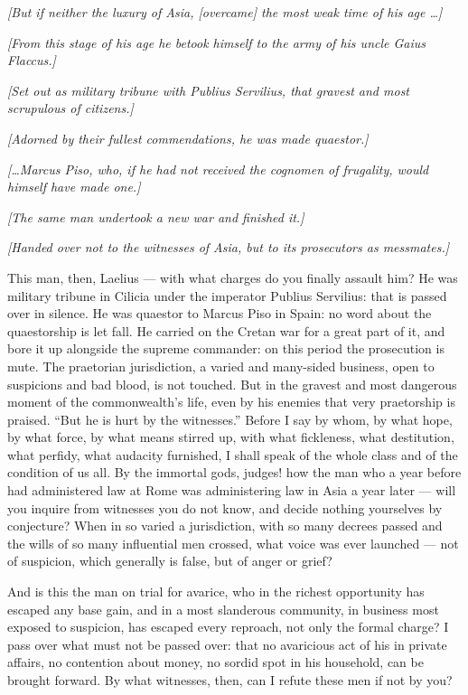  \textit{[But if neither the luxury of Asia, [overcame] the most weak time of his age \ldots]}

 \textit{[From this stage of his age he betook himself to the army of his uncle Gaius Flaccus.]}

 \textit{[Set out as military tribune with Publius Servilius, that gravest and most scrupulous of citizens.]}

 \textit{[Adorned by their fullest commendations, he was made quaestor.]}

 \textit{[\ldots Marcus Piso, who, if he had not received the cognomen of frugality, would himself have made one.]}

 \textit{[The same man undertook a new war and finished it.]}

 \textit{[Handed over not to the witnesses of Asia, but to its prosecutors as messmates.]}

 This man, then, Laelius --- with what charges do you finally assault him? He was military tribune in Cilicia under the imperator Publius Servilius: that is passed over in silence. He was quaestor to Marcus Piso in Spain: no word about the quaestorship is let fall. He carried on the Cretan war for a great part of it, and bore it up alongside the supreme commander: on this period the prosecution is mute. The praetorian jurisdiction, a varied and many-sided business, open to suspicions and bad blood, is not touched. But in the gravest and most dangerous moment of the commonwealth's life, even by his enemies that very praetorship is praised. ``But he is hurt by the witnesses.'' Before I say by whom, by what hope, by what force, by what means stirred up, with what fickleness, what destitution, what perfidy, what audacity furnished, I shall speak of the whole class and of the condition of us all. By the immortal gods, judges! how the man who a year before had administered law at Rome was administering law in Asia a year later --- will you inquire from witnesses you do not know, and decide nothing yourselves by conjecture? When in so varied a jurisdiction, with so many decrees passed and the wills of so many influential men crossed, what voice was ever launched --- not of suspicion, which generally is false, but of anger or grief?

 And is this the man on trial for avarice, who in the richest opportunity has escaped any base gain, and in a most slanderous community, in business most exposed to suspicion, has escaped every reproach, not only the formal charge? I pass over what must not be passed over: that no avaricious act of his in private affairs, no contention about money, no sordid spot in his household, can be brought forward. By what witnesses, then, can I refute these men if not by you?

